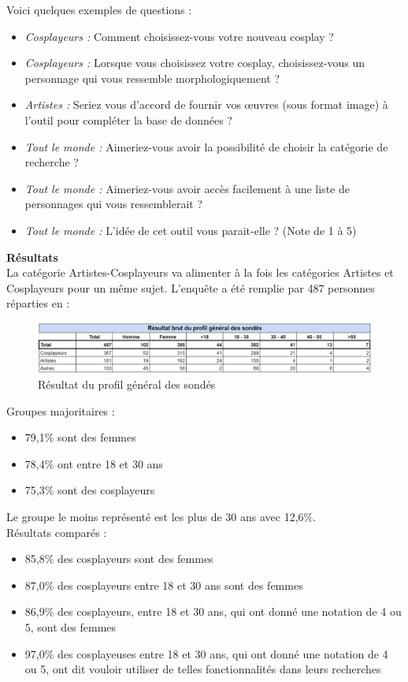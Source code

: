\documentclass[a4paper,12pt]{article}
\begin{document}
Voici quelques exemples de questions : 
\begin{itemize}
    \item \textit{Cosplayeurs : }Comment choisissez-vous votre nouveau cosplay ? 
    \item \textit{Cosplayeurs : }Lorsque vous choisissez votre cosplay, choisissez-vous un personnage qui vous ressemble morphologiquement ? 
    \item \textit{Artistes : }Seriez vous d'accord de fournir vos œuvres (sous format image) à l'outil pour compléter la base de données ?  
    \item \textit{Tout le monde : }Aimeriez-vous avoir la possibilité de choisir la catégorie de recherche ? 
    \item \textit{Tout le monde : }Aimeriez-vous avoir accès facilement à une liste de personnages qui vous ressemblerait ? 
    \item \textit{Tout le monde : }L'idée de cet outil vous parait-elle ? (Note de 1 à 5) \\
\end{itemize}

\textbf{Résultats} \\
La catégorie Artistes-Cosplayeurs va alimenter à la fois les catégories Artistes et Cosplayeurs pour un même sujet. L'enquête a été remplie par 487 personnes réparties en : 

\begin{figure}[!ht]
\centering
			\includegraphics[scale=0.6]{images/patate.PNG}
			\caption{Résultat du profil général des sondés }
		\end{figure}

Groupes majoritaires :
\begin{itemize}
    \item 79,1\% sont des femmes
    \item 78,4\% ont entre 18 et 30 ans
    \item 75,3\% sont des cosplayeurs \\
\end{itemize}

Le groupe le moins représenté est les plus de 30 ans avec 12,6\%.  \\

Résultats comparés : 
\begin{itemize}
    \item 85,8\% des cosplayeurs sont des femmes
    \item 87,0\% des cosplayeurs entre 18 et 30 ans sont des femmes
    \item 86,9\% des cosplayeurs, entre 18 et 30 ans, qui ont donné une notation de 4 ou 5, sont des femmes
    \item 97,0\% des cosplayeuses entre 18 et 30 ans, qui ont donné une notation de 4 ou 5, ont dit vouloir utiliser de telles fonctionnalités dans leurs recherches \\
\end{itemize}
\end{document}

